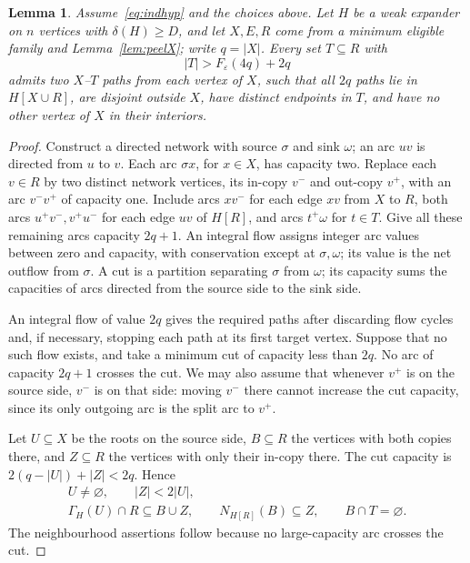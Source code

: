 \documentclass[10pt,a4paper]{amsart}
\newtheorem{lemma}{Lemma}
\newcommand{\eps}{\varepsilon}
\begin{document}
\begin{lemma}\label{lem:fullfan}
Assume~\eqref{eq:indhyp} and the choices above. Let $H$ be a weak expander on $n$ vertices with $\delta(H)\ge D$, and let $X,E,R$ come from a minimum eligible family and Lemma~\ref{lem:peelX}; write $q=|X|$. Every set $T\subseteq R$ with
\begin{equation}\label{eq:target}
|T|>F_\eps(4q)+2q
\end{equation}
admits two $X$--$T$ paths from each vertex of $X$, such that all $2q$ paths lie in $H[X\cup R]$, are disjoint outside $X$, have distinct endpoints in $T$, and have no other vertex of $X$ in their interiors.
\end{lemma}

\begin{proof}
Construct a directed network with source $\sigma$ and sink $\omega$; an arc $uv$ is directed from $u$ to $v$. Each arc $\sigma x$, for $x\in X$, has capacity two. Replace each $v\in R$ by two distinct network vertices, its in-copy $v^-$ and out-copy $v^+$, with an arc $v^-v^+$ of capacity one. Include arcs $xv^-$ for each edge $xv$ from $X$ to $R$, both arcs $u^+v^-,v^+u^-$ for each edge $uv$ of $H[R]$, and arcs $t^+\omega$ for $t\in T$. Give all these remaining arcs capacity $2q+1$. An integral flow assigns integer arc values between zero and capacity, with conservation except at $\sigma,\omega$; its value is the net outflow from $\sigma$. A cut is a partition separating $\sigma$ from $\omega$; its capacity sums the capacities of arcs directed from the source side to the sink side.

An integral flow of value $2q$ gives the required paths after discarding flow cycles and, if necessary, stopping each path at its first target vertex. Suppose that no such flow exists, and take a minimum cut of capacity less than $2q$. No arc of capacity $2q+1$ crosses the cut. We may also assume that whenever $v^+$ is on the source side, $v^-$ is on that side: moving $v^-$ there cannot increase the cut capacity, since its only outgoing arc is the split arc to $v^+$.

Let $U\subseteq X$ be the roots on the source side, $B\subseteq R$ the vertices with both copies there, and $Z\subseteq R$ the vertices with only their in-copy there. The cut capacity is $2(q-|U|)+|Z|<2q$. Hence
\begin{equation}\label{eq:cut}
\begin{gathered}
U\ne\varnothing,\qquad |Z|<2|U|,\\
\Gamma_H(U)\cap R\subseteq B\cup Z,\qquad
N_{H[R]}(B)\subseteq Z,\qquad B\cap T=\varnothing.
\end{gathered}
\end{equation}
The neighbourhood assertions follow because no large-capacity arc crosses the cut.


\end{proof}
\end{document}
